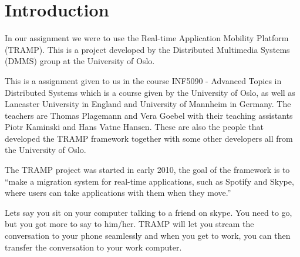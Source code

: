 \section{Introduction}
In our assignment we were to use the Real-time Application Mobility Platform (TRAMP). This is a project developed by the Distributed Multimedia Systems (DMMS) group at the University of Oslo.

This is a assignment given to us in the course INF5090 - Advanced Topics in Distributed Systems which is a course given by the University of Oslo, as well as Lancaster University in England and University of Mannheim in Germany. The teachers are Thomas Plagemann and Vera Goebel with their teaching assistants Piotr Kaminski and Hans Vatne Hansen. These are also the people that developed the TRAMP framework together with some other developers all from the University of Oslo.

The TRAMP project was started in early 2010, the goal of the framework is to ``make a migration system for real-time applications, such as Spotify and Skype, where users can take applications with them when they move.'' \cite{TRAMP-homepage}

Lets say you sit on your computer talking to a friend on skype. You need to go, but you got more to say to him/her. TRAMP will let you stream the conversation to your phone seamlessly and when you get to work, you can then transfer the conversation to your work computer.